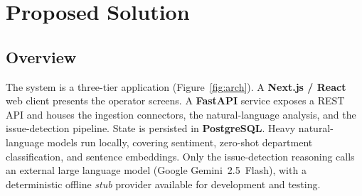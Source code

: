 \documentclass[11pt,a4paper]{article}
\begin{document}
\section{Proposed Solution}
\label{sec:solution}

\subsection{Overview}
The system is a three-tier application (Figure~\ref{fig:arch}). A \textbf{Next.js / React} web client
presents the operator screens. A \textbf{FastAPI} service exposes a REST API and houses the ingestion
connectors, the natural-language analysis, and the issue-detection pipeline. State is persisted in
\textbf{PostgreSQL}. Heavy natural-language models run locally, covering sentiment, zero-shot department
classification, and sentence embeddings. Only the issue-detection reasoning calls an external large
language model (Google Gemini~2.5~Flash), with a deterministic offline \emph{stub} provider available
for development and testing.
\end{document}

